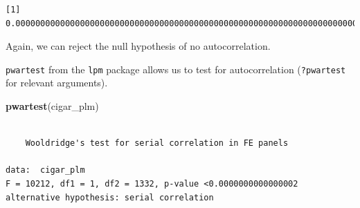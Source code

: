 \documentclass[]{book}
\newenvironment{Shaded}{\begin{snugshade}}{\end{snugshade}}
\newcommand{\DataTypeTok}[1]{\textcolor[rgb]{0.13,0.29,0.53}{#1}}
\newcommand{\DecValTok}[1]{\textcolor[rgb]{0.00,0.00,0.81}{#1}}
\newcommand{\KeywordTok}[1]{\textcolor[rgb]{0.13,0.29,0.53}{\textbf{#1}}}
\newcommand{\NormalTok}[1]{#1}
\newcommand{\OperatorTok}[1]{\textcolor[rgb]{0.81,0.36,0.00}{\textbf{#1}}}
\newcommand{\StringTok}[1]{\textcolor[rgb]{0.31,0.60,0.02}{#1}}
\begin{document}
\begin{Shaded}
\end{Shaded}

\begin{verbatim}
[1] 0.00000000000000000000000000000000000000000000000000000000000000000000000000000000000000000000000000000000000000000000000000000000000000000000000000000000000000000000000000000000000000000000000000000000000000000000000000103
\end{verbatim}

Again, we can reject the null hypothesis of no autocorrelation.

\texttt{pwartest} from the \texttt{lpm} package allows us to test for autocorrelation (\texttt{?pwartest} for relevant arguments).

\begin{Shaded}
\begin{Highlighting}[]
\KeywordTok{pwartest}\NormalTok{(cigar_plm)}
\end{Highlighting}
\end{Shaded}

\begin{verbatim}

    Wooldridge's test for serial correlation in FE panels

data:  cigar_plm
F = 10212, df1 = 1, df2 = 1332, p-value <0.0000000000000002
alternative hypothesis: serial correlation
\end{verbatim}
\end{document}

